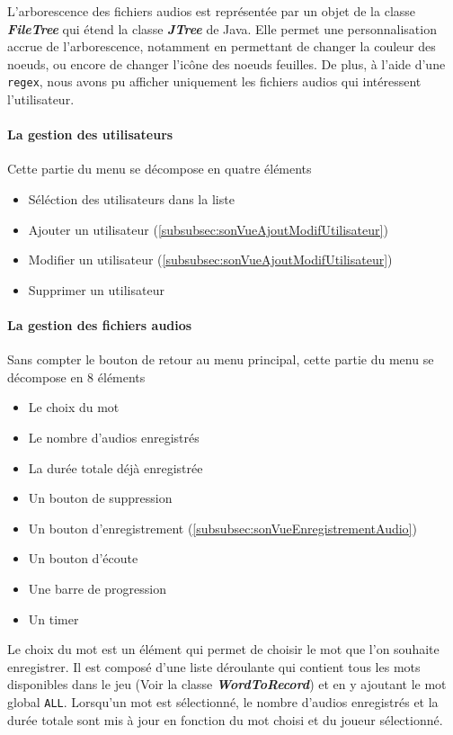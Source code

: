 L'arborescence des fichiers audios est représentée par un objet de la classe
\textbf{\textit{FileTree}} qui étend la classe \textbf{\textit{JTree}} de Java.
Elle permet une personnalisation accrue de l'arborescence, notamment en
permettant de changer la couleur des noeuds, ou encore de changer l'icône des
noeuds feuilles. De plus, à l'aide d'une \texttt{regex}, nous avons pu afficher
uniquement les fichiers audios qui intéressent l'utilisateur.

\paragraph{La gestion des utilisateurs}
Cette partie du menu se décompose en quatre éléments
\begin{itemize}
    \item{Séléction des utilisateurs dans la liste}
    \item{Ajouter un utilisateur} (\ref{subsubsec:sonVueAjoutModifUtilisateur})
    \item{Modifier un utilisateur} (\ref{subsubsec:sonVueAjoutModifUtilisateur})
    \item{Supprimer un utilisateur}
\end{itemize}

\paragraph{La gestion des fichiers audios}
Sans compter le bouton de retour au menu principal, cette partie du menu se
décompose en 8 éléments
\begin{itemize}
    \item{Le choix du mot}
    \item{Le nombre d'audios enregistrés}
    \item{La durée totale déjà enregistrée}
    \item{Un bouton de suppression}
    \item{Un bouton d'enregistrement} (\ref{subsubsec:sonVueEnregistrementAudio})
    \item{Un bouton d'écoute}
    \item{Une barre de progression}
    \item{Un timer}
\end{itemize}

Le choix du mot est un élément qui permet de choisir le mot que l'on souhaite
enregistrer. Il est composé d'une liste déroulante qui contient tous les mots
disponibles dans le jeu (Voir la classe \textbf{\textit{WordToRecord}}) et en
y ajoutant le mot global \texttt{ALL}.
Lorsqu'un mot est sélectionné, le nombre d'audios enregistrés et la durée
totale sont mis à jour en fonction du mot choisi et du joueur sélectionné.

